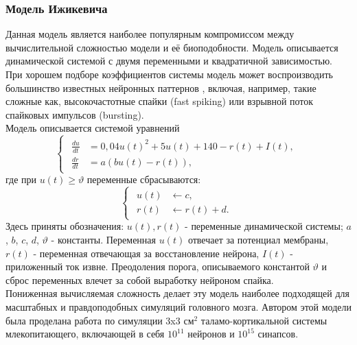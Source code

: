\documentclass[a4paper,10pt]{article}
\begin{document}
\subsubsection{Модель Ижикевича}
\indent Данная модель является наиболее популярным компромиссом между вычислительной сложностью модели и её биоподобности. Модель описывается динамической системой с двумя переменными и квадратичной зависимостью. При хорошем подборе коэффициентов системы модель может воспроизводить большинство известных нейронных паттернов \cite{IzhSimpleModel}, включая, например, такие сложные как, высокочастотные спайки (fast spiking) или взрывной поток спайковых импульсов (bursting).\\
\indent Модель описывается системой уравнений
\begin{equation}\label{eq:izh}
\left\{  \begin{array}{c} \begin{aligned}
	\frac{du}{dt} &= 0,04u(t)^2+5u(t)+140-r(t) + I(t), \nonumber \\
	\frac{dr}{dt} &= a(bu(t)-r(t)), \nonumber 
	\end{aligned}	
	\end{array} \right.
\end{equation}
где при $u(t) \geq \vartheta$ переменные сбрасываются:
\begin{equation}\label{eq:izh_reset}
\left\{  \begin{array}{c} \begin{aligned}
	u(t) &\leftarrow c \nonumber, \\
	r(t) &\leftarrow r(t)+d.
	\end{aligned}	
	\end{array} \right.
\end{equation}
Здесь приняты обозначения: $u(t), r(t)$ - переменные динамической системы; $a$, $b$, $c$, $d$, $\vartheta$ - константы. Переменная $u(t)$ отвечает за потенциал мембраны, $r(t)$ - переменная отвечающая за восстановление нейрона, $I(t)$ - приложенный ток извне. Преодоления порога, описываемого константой $\vartheta$ и сброс переменных влечет за собой выработку нейроном спайка.\\
\indent Пониженная вычисляемая сложность делает эту модель наиболее подходящей для масштабных и правдоподобных симуляций головного мозга. Автором этой модели была проделана работа \cite{IzhTalam} по симуляции 3x3 см$^2$ таламо-кортикальной системы млекопитающего, включающей в себя $10^{11}$ нейронов и $10^{15}$ синапсов.
\end{document}
